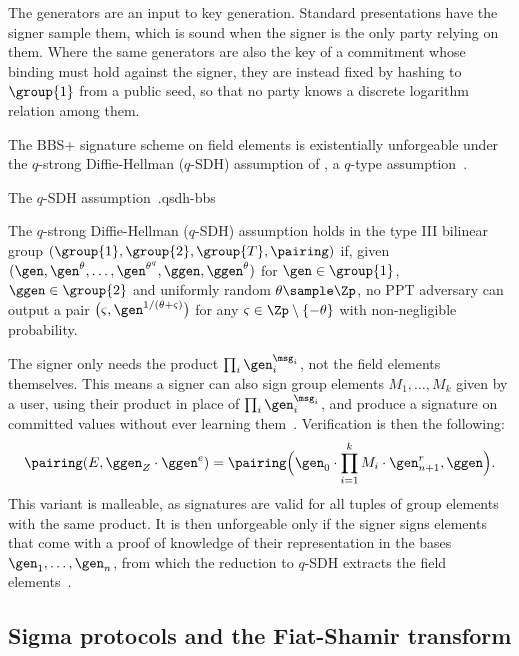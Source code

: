 The generators are an input to key generation. Standard presentations have
the signer sample them, which is sound when the signer is the only party relying
on them. Where the same generators are also the key of a commitment whose binding must hold
against the signer, they are instead fixed by hashing to $\group{1}$ from a
public seed, so that no party knows a discrete logarithm relation among them.

The BBS+ signature scheme on field elements is existentially unforgeable under
the $q$-strong Diffie-Hellman ($q$-SDH) assumption of , a $q$-type
assumption~\cite{EC:BonBoy04a}.

\begin{assumptionbox}{The $q$-SDH assumption~\cite{EC:BonBoy04a}.}{qsdh-bbs}

  The $q$-strong Diffie-Hellman ($q$-SDH) assumption holds in the type III bilinear group
$(\group{1},\group{2},\group{T},\pairing)$ if, given $(\gen, \gen^{\theta},
\ldots, \gen^{\theta^{q}}, \ggen, \ggen^{\theta})$ for $\gen \in \group{1}$,
$\ggen \in \group{2}$ and uniformly random $\theta \sample \Zp$, no PPT
adversary can output a pair $\big(\varsigma,
\gen^{1/(\theta+\varsigma)}\big)$ for any $\varsigma \in \Zp \setminus
\{-\theta\}$ with non-negligible probability.

\end{assumptionbox}

The signer only needs the product $\prod_i \gen_i^{\msg_i}$, not the field
elements themselves. This means a signer can also sign group elements $M_1, \ldots,
M_k$ given by a user, using their product in place of $\prod_i
\gen_i^{\msg_i}$, and produce a signature on committed values without ever
learning them~\cite{SCN:AuSusMu06,EC:TesZhu23b}. Verification is then the
following:
%
\begin{equation*}
  \pairing(E,\ggen_Z\cdot\ggen^{e}) = \pairing\Big(\gen_0 \cdot
\prod_{i=1}^{k} M_i \cdot \gen_{n+1}^{r}, \ggen\Big).
\end{equation*}
%
This variant is malleable, as signatures are valid for all tuples of group
elements with the same product. It is then unforgeable only if
the signer signs elements that come with a proof of knowledge of their
representation in the bases $\gen_1, \ldots, \gen_n$, from which the reduction
to $q$-SDH extracts the field elements~\cite{SCN:AuSusMu06,EC:TesZhu23b}.

\subsection{Sigma protocols and the Fiat-Shamir transform}\label{sec:prelims-sigma}

